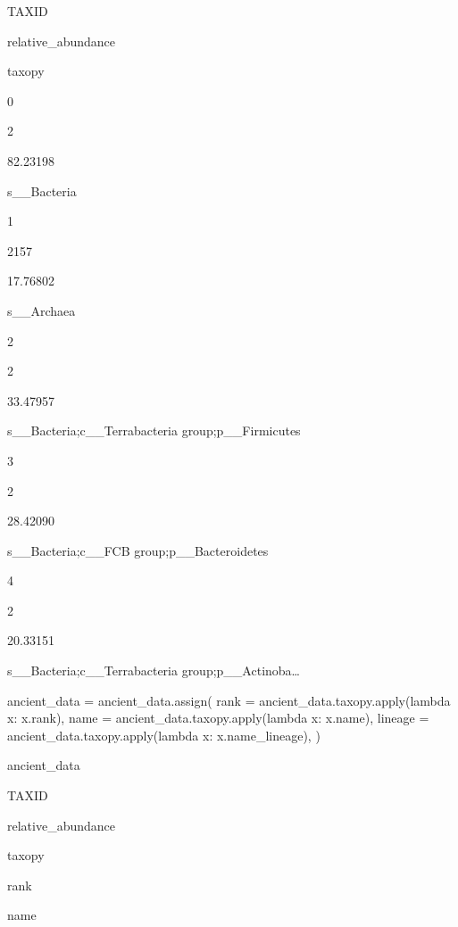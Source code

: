 \documentclass[
  letterpaper,
]{book}
\newenvironment{Shaded}{}{}
\newcommand{\BuiltInTok}[1]{\textcolor[rgb]{0.84,0.23,0.29}{#1}}
\newcommand{\KeywordTok}[1]{\textcolor[rgb]{0.84,0.23,0.29}{#1}}
\newcommand{\NormalTok}[1]{\textcolor[rgb]{0.14,0.16,0.18}{#1}}
\newcommand{\OperatorTok}[1]{\textcolor[rgb]{0.14,0.16,0.18}{#1}}
\begin{document}
TAXID

relative\_abundance

taxopy

0

2

82.23198

s\_\_Bacteria

1

2157

17.76802

s\_\_Archaea

2

2

33.47957

s\_\_Bacteria;c\_\_Terrabacteria group;p\_\_Firmicutes

3

2

28.42090

s\_\_Bacteria;c\_\_FCB group;p\_\_Bacteroidetes

4

2

20.33151

s\_\_Bacteria;c\_\_Terrabacteria group;p\_\_Actinoba\ldots{}

\begin{Shaded}
\begin{Highlighting}[]
\NormalTok{ancient\_data }\OperatorTok{=}\NormalTok{ ancient\_data.assign(}
\NormalTok{    rank }\OperatorTok{=}\NormalTok{ ancient\_data.taxopy.}\BuiltInTok{apply}\NormalTok{(}\KeywordTok{lambda}\NormalTok{ x: x.rank),}
\NormalTok{    name }\OperatorTok{=}\NormalTok{ ancient\_data.taxopy.}\BuiltInTok{apply}\NormalTok{(}\KeywordTok{lambda}\NormalTok{ x: x.name),}
\NormalTok{    lineage }\OperatorTok{=}\NormalTok{ ancient\_data.taxopy.}\BuiltInTok{apply}\NormalTok{(}\KeywordTok{lambda}\NormalTok{ x: x.name\_lineage),}
\NormalTok{)}
\end{Highlighting}
\end{Shaded}

\begin{Shaded}
\begin{Highlighting}[]
\NormalTok{ancient\_data}
\end{Highlighting}
\end{Shaded}

TAXID

relative\_abundance

taxopy

rank

name
\end{document}
